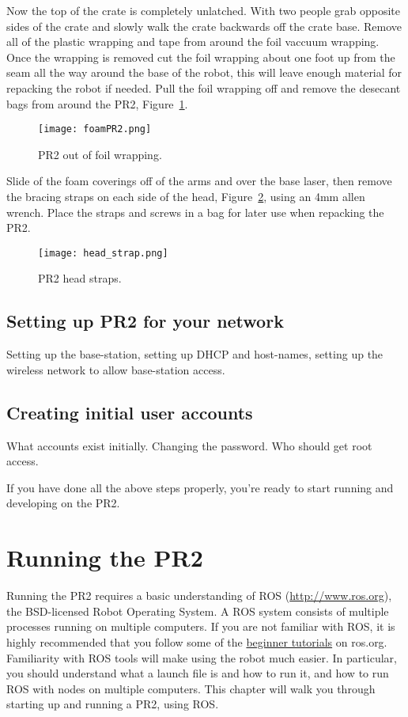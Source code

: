 Now the top of the crate is completely unlatched. With two people grab opposite
sides of the crate and slowly walk the crate backwards off the crate
base. Remove all of the plastic wrapping and tape from around the foil vaccuum
wrapping. Once the wrapping is removed cut the foil wrapping about one foot up
from the seam all the way around the base of the robot, this will leave enough
material for repacking the robot if needed. Pull the foil wrapping off and
remove the desecant bags from around the PR2, Figure~\ref{fig:foamPR2}.

\begin{figure}[h]
\centering
\texttt{[image: foamPR2.png]}
\caption{PR2 out of foil wrapping.}
\label{fig:foamPR2}
\end{figure}

Slide of the foam coverings off of the arms and over the base laser, then remove
the bracing straps on each side of the head, Figure~\ref{fig:head_straps}, using
an 4mm allen wrench. Place the straps and screws in a bag for later use when
repacking the PR2.

\begin{figure}[h]
\centering
\texttt{[image: head\_strap.png]}
\caption{PR2 head straps.}
\label{fig:head_straps}
\end{figure}






\section{Setting up PR2 for your network}
Setting up the base-station, setting up DHCP and host-names, setting up the wireless network to allow base-station access.
\section{Creating initial user accounts}
What accounts exist initially.  Changing the password.  Who should get root access.

If you have done all the above steps properly, you're ready to start running and developing on the PR2.

\chapter{Running the PR2}
Running the PR2 requires a basic understanding of ROS (\href{http://www.ros.org}{http://www.ros.org}), the BSD-licensed 
Robot Operating System.  A ROS system consists of multiple processes running on multiple computers.  If you are not 
familiar with ROS, it is highly recommended that you follow some of the \href{http://www.ros.org/wiki/ROS/Tutorials}{beginner tutorials} 
on ros.org. Familiarity with ROS tools will make using the robot much easier.  In particular, you should understand 
what a launch file is and how to run it, and how to run ROS with nodes on multiple computers. This chapter will walk 
you through starting up and running a PR2, using ROS.

